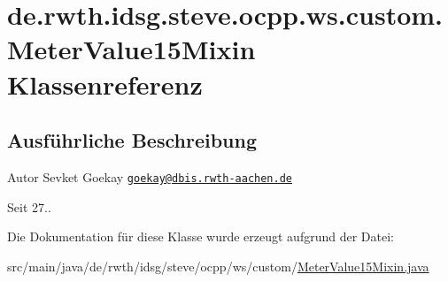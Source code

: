\hypertarget{classde_1_1rwth_1_1idsg_1_1steve_1_1ocpp_1_1ws_1_1custom_1_1_meter_value15_mixin}{\section{de.\+rwth.\+idsg.\+steve.\+ocpp.\+ws.\+custom.\+Meter\+Value15\+Mixin Klassenreferenz}
\label{classde_1_1rwth_1_1idsg_1_1steve_1_1ocpp_1_1ws_1_1custom_1_1_meter_value15_mixin}
}


\subsection{Ausführliche Beschreibung}
\begin{DoxyAuthor}{Autor}
Sevket Goekay \href{mailto:goekay@dbis.rwth-aachen.de}{\tt goekay@dbis.\+rwth-\/aachen.\+de} 
\end{DoxyAuthor}
\begin{DoxySince}{Seit}
27.. 
\end{DoxySince}


Die Dokumentation für diese Klasse wurde erzeugt aufgrund der Datei\+:\begin{DoxyCompactItemize}
\item 
src/main/java/de/rwth/idsg/steve/ocpp/ws/custom/\hyperlink{_meter_value15_mixin_8java}{Meter\+Value15\+Mixin.\+java}\end{DoxyCompactItemize}
